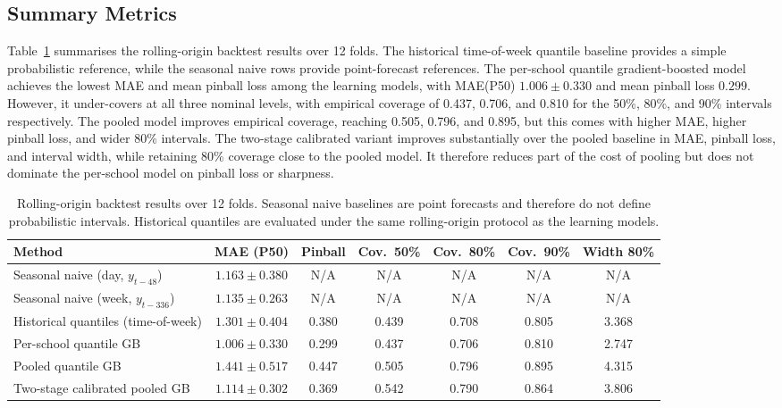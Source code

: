 \documentclass[12pt,a4paper]{article}
\begin{document}
\subsection{Summary Metrics}

Table~\ref{tab:results} summarises the rolling-origin backtest results over 12 folds. The historical time-of-week quantile baseline provides a simple probabilistic reference, while the seasonal naive rows provide point-forecast references. The per-school quantile gradient-boosted model achieves the lowest MAE and mean pinball loss among the learning models, with MAE(P50) $1.006\pm0.330$ and mean pinball loss $0.299$. However, it under-covers at all three nominal levels, with empirical coverage of 0.437, 0.706, and 0.810 for the 50\%, 80\%, and 90\% intervals respectively. The pooled model improves empirical coverage, reaching 0.505, 0.796, and 0.895, but this comes with higher MAE, higher pinball loss, and wider 80\% intervals. The two-stage calibrated variant improves substantially over the pooled baseline in MAE, pinball loss, and interval width, while retaining 80\% coverage close to the pooled model. It therefore reduces part of the cost of pooling but does not dominate the per-school model on pinball loss or sharpness.

\begin{table}[H]
\centering
\caption{Rolling-origin backtest results over 12 folds. Seasonal naive baselines are point forecasts and therefore do not define probabilistic intervals. Historical quantiles are evaluated under the same rolling-origin protocol as the learning models.}
\label{tab:results}
\small
\begin{tabularx}{\textwidth}{>{\raggedright\arraybackslash}Xcccccc}
\toprule
\textbf{Method} & \textbf{MAE (P50)} & \textbf{Pinball} & \textbf{Cov.\ 50\%} & \textbf{Cov.\ 80\%} & \textbf{Cov.\ 90\%} & \textbf{Width 80\%} \\
\midrule
Seasonal naive (day, $y_{t-48}$)    & $1.163\pm0.380$ & N/A & N/A & N/A & N/A & N/A \\
Seasonal naive (week, $y_{t-336}$)  & $1.135\pm0.263$ & N/A & N/A & N/A & N/A & N/A \\
Historical quantiles (time-of-week) & $1.301\pm0.404$ & 0.380 & 0.439 & 0.708 & 0.805 & 3.368 \\
Per-school quantile GB              & $1.006\pm0.330$ & 0.299 & 0.437 & 0.706 & 0.810 & 2.747 \\
Pooled quantile GB                  & $1.441\pm0.517$ & 0.447 & 0.505 & 0.796 & 0.895 & 4.315 \\
Two-stage calibrated pooled GB      & $1.114\pm0.302$ & 0.369 & 0.542 & 0.790 & 0.864 & 3.806 \\
\bottomrule
\end{tabularx}
\end{table}
\end{document}
